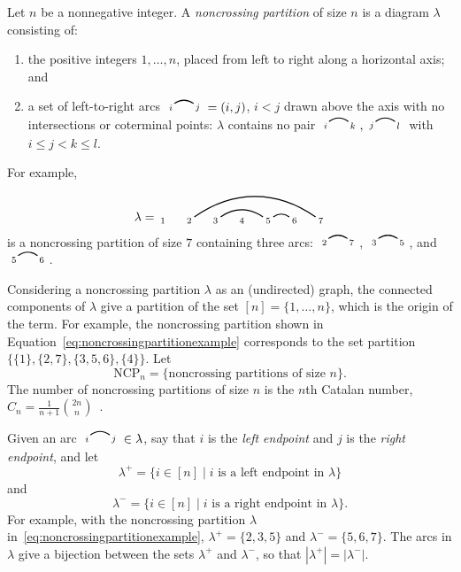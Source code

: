 \documentclass[submission]{FPSAC2024}
\theoremstyle{definition}
\theoremstyle{remark}
\numberwithin{equation}{section}
\newcommand{\NCP}{\mathrm{NCP}}
\newcommand{\edge}[2]{\tikz[scale = 0.75, baseline = -0.2cm]{
\draw (0.1, 0) node[inner sep = 0ex] (a) {};
\node[left, xshift = 0.1cm, yshift = -0.1cm] at (a) {$\scriptstyle #1$};
\draw (0.9, 0)  node[inner sep = 0ex] (b) {};
\node[right, xshift = -0.1cm, yshift = -0.1cm] at (b) {$\scriptstyle #2$};
\draw[thick] (a) to[out = 35, in = 145] (b);}}
\begin{document}
Let $n$ be a nonnegative integer.  A \emph{noncrossing partition} of size $n$ is a diagram $\lambda$ consisting of:
\begin{enumerate}
\item the positive integers $1, \ldots, n$, placed from left to right along a horizontal axis; and

\item a set of left-to-right arcs $\edge{i}{j} = (i, j)$, $i < j$ drawn above the axis with no intersections or coterminal points: $\lambda$ contains no pair $\edge{i}{k}, \edge{j}{l}$ with $i \le j < k \le l$.

\end{enumerate}
For example,
\begin{equation}
\label{eq:noncrossingpartitionexample}
\lambda = \begin{tikzpicture}[scale = 0.75, baseline = 0.75*-0.2]
\foreach \x in {1, ..., 7}{\draw[fill] (\x - 1, 0) node[inner sep = 2pt] (\x) {$\scriptstyle \x$};}
\foreach \i\j in {5/6, 3/5,2/7}{\draw[thick] (\i) to[out = 35, in = 145] (\j);}
\end{tikzpicture}
\end{equation}
is a noncrossing partition of size $7$ containing three arcs: $\edge{2}{7}$, $\edge{3}{5}$, and $\edge{5}{6}$.

Considering a noncrossing partition $\lambda$ as an (undirected) graph, the connected components of $\lambda$ give a partition of the set $[n] = \{1, \ldots, n\}$, which is the origin of the term.  For example, the noncrossing partition shown in Equation~\eqref{eq:noncrossingpartitionexample} corresponds to the set partition $\big\{ \{1\}, \{2, 7\}, \{3, 5, 6\}, \{4\}  \big\}$.  Let
\[
\NCP_{n} = \{ \text{noncrossing partitions of size $n$} \}.
\]
The number of noncrossing partitions of size $n$ is the $n$th Catalan number, $C_{n} = \frac{1}{n+1}\binom{2n}{n}$~\cite[Exercise 6.19 pp]{S99}.

Given an arc $ \edge{i}{j} \in \lambda$, say that $i$ is the \emph{left endpoint} and $j$ is the \emph{right endpoint}, and let
\[
\lambda^{+} = \{ i \in [n] \;|\; \text{$i$ is a left endpoint in $\lambda$} \}
\]
and
\[
\lambda^{-} = \{ i \in [n] \;|\; \text{$i$ is a right endpoint in $\lambda$} \}.
\]
For example, with the noncrossing partition $\lambda$ in~\eqref{eq:noncrossingpartitionexample}, $\lambda^{+} = \{2, 3, 5\}$ and $\lambda^{-} = \{5, 6, 7\}$.  The arcs in $\lambda$ give a bijection between the sets $\lambda^{+}$ and $\lambda^{-}$, so that $|\lambda^{+}| = |\lambda^{-}|.$
\end{document}
